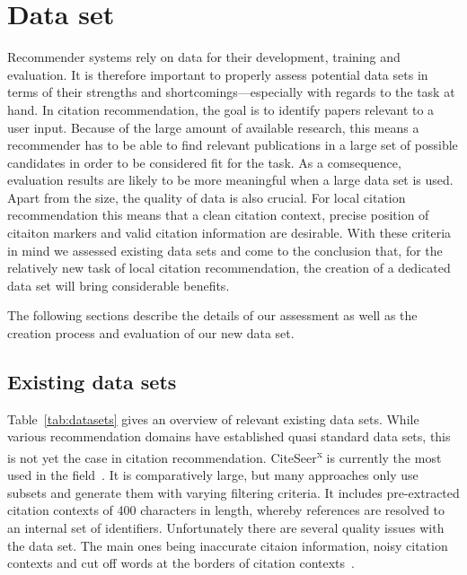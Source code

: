 \chapter{Data set}\label{chap:dataset}
Recommender systems rely on data for their development, training and evaluation. It is therefore important to properly assess potential data sets in terms of their strengths and shortcomings---especially with regards to the task at hand. In citation recommendation, the goal is to identify papers relevant to a user input. Because of the large amount of available research, this means a recommender has to be able to find relevant publications in a large set of possible candidates in order to be considered fit for the task. As a comsequence, evaluation results are likely to be more meaningful when a large data set is used. Apart from the size, the quality of data is also crucial. For local citation recommendation this means that a clean citation context, precise position of citaiton markers and valid citation information are desirable. With these criteria in mind we assessed existing data sets and come to the conclusion that, for the relatively new task of local citation recommendation, the creation of a dedicated data set will bring considerable benefits.

The following sections describe the details of our assessment as well as the creation process and evaluation of our new data set.

\section{Existing data sets}

Table~\ref{tab:datasets} gives an overview of relevant existing data sets. While various recommendation domains have established quasi standard data sets, this is not yet the case in citation recommendation. CiteSeer\textsuperscript{x} is currently the most used in the field~\cite{Beel2016}. It is comparatively large, but many approaches only use subsets and generate them with varying filtering criteria. It includes pre-extracted citation contexts of 400 characters in length, whereby references are resolved to an internal set of identifiers. Unfortunately there are several quality issues with the data set. The main ones being inaccurate citaion information, noisy citation contexts and cut off words at the borders of citation contexts~\cite{Roy2016}.

